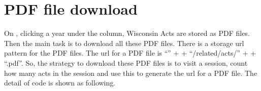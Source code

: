 \documentclass[letterpaper,10pt,english]{jupyterBook}
\begin{document}
\section{PDF file download}
\label{\detokenize{ch52:pdf-file-download}}
\sphinxAtStartPar
On , clicking a year under the  column, Wisconsin Acts are stored as PDF files. Then the main task is to download all these PDF files. There is a storage url pattern for the PDF files. The url for a PDF file is “” +  + “/related/acts/” +  + “.pdf”. So, the strategy to download these PDF files is to visit a session, count how many acts in the session and use this to generate the url for a PDF file. The detail of code is shown as following. 
\end{document}
